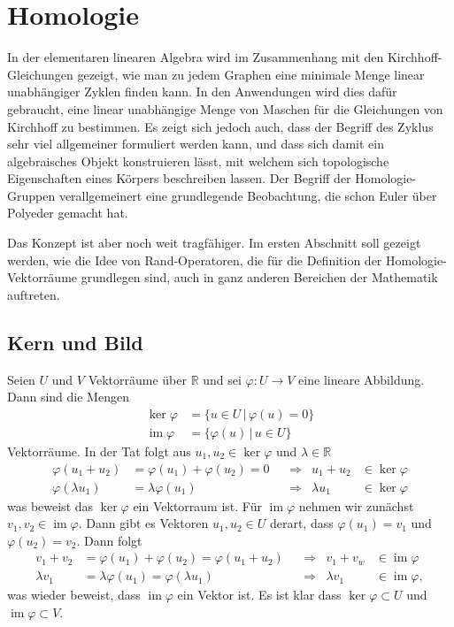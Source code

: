 %
%
%
\chapter{Homologie%
\label{chapter:homologie}}
\rhead{}
In der elementaren linearen Algebra wird im Zusammenhang mit den
Kirchhoff-Gleichungen gezeigt, wie man zu jedem Graphen eine
minimale Menge linear unabhängiger Zyklen finden kann.
In den Anwendungen wird dies dafür gebraucht, eine linear unabhängige
Menge von Maschen für die Gleichungen von Kirchhoff zu bestimmen.
Es zeigt sich jedoch auch, dass der Begriff des Zyklus sehr viel
allgemeiner formuliert werden kann, und dass sich damit ein algebraisches
Objekt konstruieren lässt, mit welchem sich topologische Eigenschaften
eines Körpers beschreiben lassen.
Der Begriff der Homologie-Gruppen verallgemeinert eine grundlegende
Beobachtung, die schon Euler über Polyeder gemacht hat.

Das Konzept ist aber noch weit tragfähiger.
Im ersten Abschnitt soll gezeigt werden, wie die Idee von Rand-Operatoren,
die für die Definition der Homologie-Vektorräume grundlegen sind, 
auch in ganz anderen Bereichen der Mathematik auftreten.



\section{Kern und Bild}
Seien $U$ und $V$ Vektorräume über $\mathbb R$ und sei $\varphi\colon U\to V$
eine lineare Abbildung.
Dann sind die Mengen
\begin{align*}
\operatorname{ker}\varphi&=\{u\in U\,|\, \varphi(u) = 0\}
\\
\operatorname{im}\varphi&=\{\varphi(u)\,|\, u\in U\}
\end{align*}
Vektorräume.
In der Tat folgt aus $u_1,u_2\in\operatorname{ker}\varphi$
und $\lambda\in\mathbb R$
\begin{align*}
\varphi(u_1+u_2)&=\varphi(u_1)+\varphi(u_2) = 0
&
&\Rightarrow&
u_1+u_2&\in\operatorname{ker}\varphi
\\
\varphi(\lambda u_1)&=\lambda\varphi(u_1)
&
&\Rightarrow&
\lambda u_1&\in\operatorname{ker}\varphi
\end{align*}
was beweist das $\operatorname{ker}\varphi$ ein Vektorraum ist.
Für $\operatorname{im}\varphi$ nehmen wir zunächst
$v_1,v_2\in\operatorname{im}\varphi$.
Dann gibt es Vektoren $u_1,u_2\in U$ derart, dass
$\varphi(u_1)=v_1$ und $\varphi(u_2)=v_2$.
Dann folgt
\begin{align*}
v_1+v_2&=\varphi(u_1)+\varphi(u_2)=\varphi(u_1+u_2)
&
&\Rightarrow&
v_1+v_w&\in\operatorname{im}\varphi
\\
\lambda v_1&=\lambda\varphi(u_1)=\varphi(\lambda u_1)
&
&\Rightarrow&
\lambda v_1&\in\operatorname{im}\varphi,
\end{align*}
was wieder beweist, dass $\operatorname{im}\varphi$ ein Vektor ist.
Es ist klar dass $\operatorname{ker}\varphi\subset U$ und
$\operatorname{im}\varphi\subset V$.

